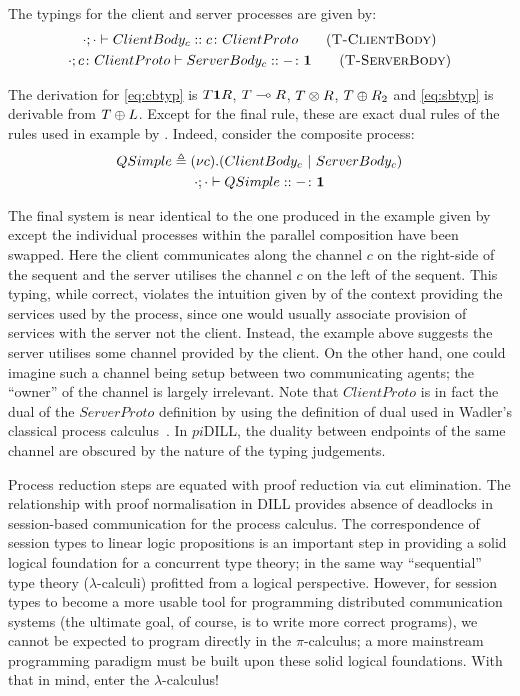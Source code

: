 \documentclass{mprop}
\begin{document}
\begin{samepage}
The typings for the client and server processes are given by:
\begin{gather*}
\tsequent{\cdot}{\cdot}{ClientBody_c}{\typedid{c}{ClientProto}}
\tag{\mkTrule{ClientBody}} \label{eq:cbtyp}
\\ \tsequent{\cdot}{\typedid{c}{ClientProto}}{ServerBody_c}{\typedid{-}{\1}}
\tag{\mkTrule{ServerBody}} \label{eq:sbtyp}
\end{gather*}
\end{samepage}

The derivation for \eqref{eq:cbtyp} is $T\mathbf{1} R$, ${T}\multimap{R}$, ${T}\otimes{R}$,
${T}\oplus{R_2}$ and \eqref{eq:sbtyp} is derivable from
${T}\oplus{L}$. Except for the final rule, these are exact dual rules of the
rules used in example by \citeauthor{Caires:2010:STI}. Indeed, consider the
composite process:
\begin{gather*}
{QSimple}\triangleq{(\nu{c}).({ClientBody_c}~|~{ServerBody_c})}\\
{\cdot};{\cdot}\vdash{QSimple}::{{-}\colon{\mathbf{1}}}
\end{gather*}

The final system is near identical to the one produced in the example given by
\citeauthor{Caires:2010:STI} except the individual processes within the
parallel composition have been swapped. Here the client communicates along the
channel $c$ on the right-side of the sequent and the server utilises the
channel $c$ on the left of the sequent. This typing, while correct, violates
the intuition given by \citeauthor{Caires:2010:STI} of the context providing
the services used by the process, since one would usually associate provision
of services with the server not the client. Instead, the example above
suggests the server utilises some channel provided by the client. On the other
hand, one could imagine such a channel being setup between two communicating
agents; the ``owner'' of the channel is largely irrelevant. Note that
$ClientProto$ is in fact the dual of the $ServerProto$ definition by
\citeauthor{Caires:2010:STI} using the definition of dual used in Wadler's
classical process calculus~\cite{Wadler:2014}. In $pi$DILL, the duality
between endpoints of the same channel are obscured by the nature of the typing
judgements.

Process reduction steps are equated with proof reduction via cut
elimination. The relationship with proof normalisation in DILL provides
absence of deadlocks in session-based communication for the process
calculus. The correspondence of session types to linear logic propositions is
an important step in providing a solid logical foundation for a concurrent
type theory; in the same way ``sequential'' type theory ($\lambda$-calculi)
profitted from a logical perspective. However, for session types to become a
more usable tool for programming distributed communication systems (the
ultimate goal, of course, is to write more correct programs), we cannot be
expected to program directly in the $\pi$-calculus; a more mainstream
programming paradigm must be built upon these solid logical foundations. With
that in mind, enter the $\lambda$-calculus!
\end{document}
